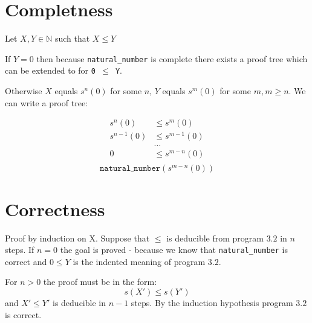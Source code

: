 \documentclass{article}
\begin{document}
\section{Completness}

Let $X, Y \in \mathbb{N}$ such that $X \le Y$

If $Y = 0$ then because \texttt{natural\_number} is complete there exists a proof
tree which can be extended to for \texttt{0 $\le$ Y}.

Otherwise 
$X$ equals $s^n(0)$ for some $n$, $Y$ equals $s^m(0)$ for some $m, m \ge n$. We can write
a proof tree:

\[
\begin{aligned}
   s^n(0)    & \le s^m(0) \\
   s^{n-1}(0) & \le s^{m-1}(0) \\
   & \ldots \\
   0          & \le s^{m-n}(0) \\
\end{aligned}
\]
\[
\texttt{natural\_number}(s^{m-n}(0)) 
\]

\section{Correctness}

Proof by induction on X. Suppose that $\le$ is deducible from program $3.2$ in
$n$ steps. If $n = 0$ the goal is proved - because we know that
\texttt{natural\_number} is correct and $0 \le Y$ is the indented meaning of
program $3.2$.

For $n > 0$ the proof must be in the form:
\[
   s(X') \le s(Y')
\]
and $X' \le Y'$ is deducible in $n - 1$ steps. By the induction hypothesis
program $3.2$ is correct.
\end{document}
